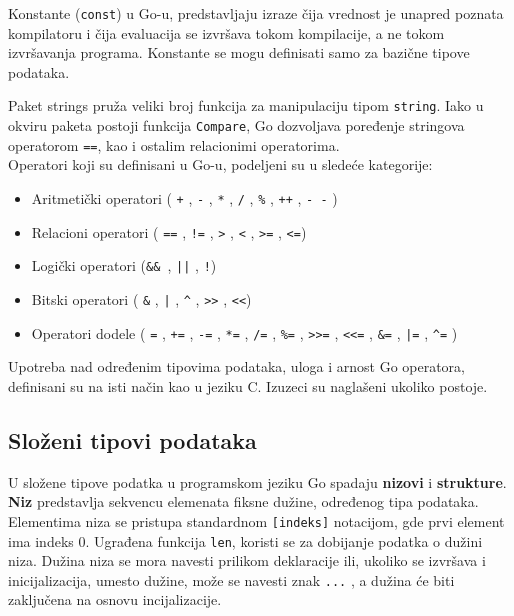 \documentclass[12pt,oneside]{memoir}
\begin{document}
Konstante (\texttt{const}) u Go-u, predstavljaju izraze čija vrednost je unapred poznata kompilatoru i čija evaluacija se izvršava tokom kompilacije, a ne tokom izvršavanja programa. Konstante se mogu definisati samo za bazične tipove podataka. 

Paket strings pruža veliki broj funkcija za manipulaciju tipom \texttt{string}. Iako u okviru paketa postoji funkcija \texttt{Compare}, Go dozvoljava poređenje stringova operatorom \texttt{==}, kao i ostalim relacionimi operatorima.
\\

Operatori koji su definisani u Go-u, podeljeni su u sledeće kategorije:
\begin{itemize}

\item Aritmetički operatori ( \texttt{+} ,  \texttt{-} , \texttt{*} ,  \texttt{/} ,  \texttt{\%} ,  \texttt{++} ,   \texttt{- -} )
\item Relacioni operatori ( \texttt{==} ,  \texttt{!=} ,  \texttt{>} ,  \texttt{<} ,  \texttt{>=} ,  \texttt{<=})
\item Logički operatori (\texttt{\&\& },  \texttt{||} ,  \texttt{!})
\item Bitski operatori ( \texttt{\&} ,  \texttt{|} ,  \texttt{\^} ,  \texttt{>{}>} ,  \texttt{<{}<})
\item Operatori dodele ( \texttt{=} ,  \texttt{+=} ,  \texttt{-=} ,  \texttt{*=} ,  \texttt{/=} ,  \texttt{\%=} ,   \texttt{>{}>=} ,  \texttt{<{}<=} ,  \texttt{\&=} ,  \texttt{|=} ,  \texttt{\^{}=} )

\end{itemize}

Upotreba nad određenim tipovima podataka, uloga i arnost Go operatora, definisani su na isti način kao u jeziku C. Izuzeci su naglašeni ukoliko postoje. 

\subsection{Složeni tipovi podataka}
U složene tipove podatka u programskom jeziku Go spadaju \textbf{nizovi} i \textbf{strukture}.
\\

\textbf{Niz} predstavlja sekvencu elemenata fiksne dužine, određenog tipa podataka. Elementima niza se pristupa standardnom \texttt{[indeks]} notacijom, gde prvi element ima indeks 0. Ugrađena funkcija \texttt{len}, koristi se za dobijanje podatka o dužini niza. Dužina niza se mora navesti prilikom deklaracije ili, ukoliko se izvršava i inicijalizacija, umesto dužine, može se navesti znak \texttt{...} , a dužina će biti zaključena na osnovu incijalizacije.
\end{document}
